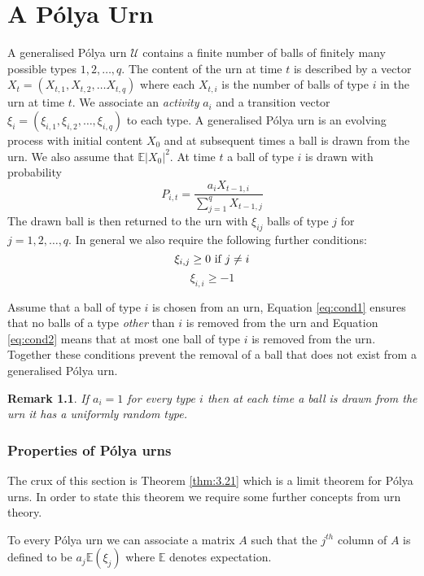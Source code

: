\documentclass[oneside]{book} %
\newtheorem{remk}{Remark}
\theoremstyle{definition}
\numberwithin{equation}{section}
\begin{document}
\chapter{A P\'{o}lya Urn}
A generalised P\'{o}lya urn $\mathcal{U}$ contains a finite number of balls of finitely many possible types $1,2,\dots,q$. The content of the urn at time $t$
is described by a vector $X_{t} = (X_{t,1},X_{t,2},\dots X_{t,q})$ where each $X_{t,i}$ is the number of balls of type $i$ in the urn at time $t$.  We associate an
\emph{activity} $a_{i}$ and a transition vector $\xi_{i} = (\xi_{i,1},\xi_{i,2},\dots,\xi_{i,q})$ to each type.  A generalised P\'{o}lya urn is an evolving process with initial
content $X_0$ and at subsequent times a ball is drawn from the urn. We also assume that $\mathbb{E} \lvert X_0 \rvert^2$.  At time $t$ a ball of type $i$ is drawn with probability
\[P_{i,t} = \frac{a_{i}X_{t-1,i}}{\sum_{j=1}^q X_{t-1,j}}\]  
The drawn ball is then  returned to the urn with $\xi_{ij}$ balls of type $j$ for $j = 1,2,\dots,q$.  In general we also require the following further conditions:
\begin{equation}\label{eq:cond1}
 \xi_{i,j} \geq 0 \text{   if   } j \neq i\\ 
\end{equation}
\begin{equation}\label{eq:cond2}
 \xi_{i,i} \geq -1 
\end{equation}

Assume that a ball of type $i$ is chosen from an urn, Equation \ref{eq:cond1} ensures that no balls of a type \emph{other} than $i$ is removed from the urn and Equation \ref{eq:cond2} means that at most one ball of type $i$  is removed from the urn.  Together these conditions prevent the removal of a ball that does not exist from a generalised P\'{o}lya urn.      

\begin{remk}
 If $a_i = 1$ for every type $i$ then at each time a ball is drawn from the urn it has a uniformly random type.   
\end{remk}

\subsection{Properties of P\'{o}lya urns}
The crux of this section is Theorem \ref{thm:3.21} which is a limit theorem for P\'{o}lya urns.  In order to state this theorem we require some further concepts from urn theory.

To every P\'{o}lya urn we can associate a matrix $A$ such that the $j^{th}$ column of $A$ is defined to be $a_j \mathbb{E}(\xi_{j})$ where $\mathbb{E}$ denotes expectation.
\end{document}
